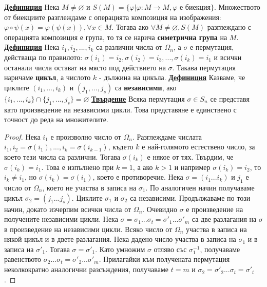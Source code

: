 \documentclass{article}
\begin{document}
\textbf{\underline{Дефиниция}}
Нека $M \neq \varnothing$ и $S(M) = \{\varphi | \varphi : M \rightarrow M, \varphi \text{ е биекция}\}$.
Множеството от биекциите разглеждаме с операцията композиция на изображения: $\varphi \circ \psi(x) =
\varphi(\psi(x)), \forall x \in M$. Тогава ако $\forall M \neq \varnothing, S(M)$ разглеждано с операцията
композиция е група, то тя се нарича \textbf{симетрична група} на $M$. \newline\newline
\textbf{\underline{Дефиниция}}
Нека $i_1, i_2, ..., i_k$ са различни числа от $\Omega_n$, а $\sigma$ е пермутация, действаща по правилото: $\sigma(i_1) = i_2,
\sigma(i_2) = i_3, ..., \sigma(i_k) = i_1$ и всички останали числа остават на място под действието на $\sigma$. Такава пермутация
наричаме \textbf{цикъл}, а числото $k$ - дължина на цикъла. \newline\newline
\textbf{\underline{Дефиниция}}
Казваме, че циклите $(i_1, ..., i_k)$ и $(j_1, ..., j_s)$ са \textbf{независими}, ако $\{i_1, ..., i_k\} \cap \{j_1, ..., j_s\} =
\varnothing$ \newline\newline
\textbf{\underline{Твърдение}} \newline
Всяка пермутация $\sigma \in S_n$ се представя като произведение на независими цикли. Това представяне е единствено с точност
до реда на множителите.
\begin{proof}
Нека $i_1$ е произволно число от $\Omega_n$. Разглеждаме числата $i_1, i_2 = \sigma(i_1), ..., i_k = \sigma(i_{k-1})$, където
$k$ е най-голямото естествено число, за което тези числа са различни. Тогава $\sigma(i_k)$ е някое от тях. Твърдим, че $\sigma
(i_k) = i_1$. Това е изпълнено при $k = 1$, а ако $k > 1$ и например $\sigma(i_k) = i_2$, то $i_k \neq i_1$, но $\sigma(i_k)
= \sigma(i_1)$, което е противоречие. \newline\newline Нека $\sigma = (i_1...i_k)$ и $j_1$ е число от $\Omega_n$, което не участва в
записа на $\sigma_1$. По аналогичен начин получаваме цикъл $\sigma_2 = (j_1...j_s)$. Циклите $\sigma_1$ и $\sigma_2$ са независими.
Продължаваме по този начин, докато изчерпим всички числа от $\Omega_n$. Очевидно $\sigma$ е произведение на получените независими
цикли. \newline\newline Нека $\sigma = \sigma_1...\sigma_t = \sigma'_1...\sigma'_m$ са две разлагания на $\sigma$ в произведение на
независими цикли. Всяко число от $\Omega_n$ участва в записа на някой цикъл и в двете разлагания. Нека дадено число участва в
записа на $\sigma_1$ и в записа на $\sigma'_1$. Тогава $\sigma = \sigma'_1$. Като умножим $\sigma$ отляво със $\sigma^{-1}_1$,
получаваме равенството $\sigma_2...\sigma_t = \sigma'_2...\sigma'_m$. Прилагайки към получената пермутация неколкократно
аналогични разсъждения, получаваме $t = m$ и $\sigma_2 = \sigma'_2...\sigma_t = \sigma'_t$.
\end{proof}
\end{document}
